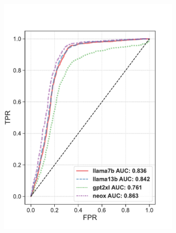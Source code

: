 \documentclass[letterpaper]{article}
\begin{document}
\begin{figure}[ht]
\centering
\hspace*{0mm}
\begin{subfigure}[b]{0.48\linewidth}
\centering
\includegraphics[width=\linewidth,trim={0cm 0.8cm 1cm 1cm},clip]{pictures/AI_AUCtrain.pdf}
\label{ai_auc_train}
\end{subfigure}
\hspace{0.3mm}
\begin{subfigure}[b]{0.48\linewidth}
\centering

\end{subfigure}
\end{figure}
\end{document}
